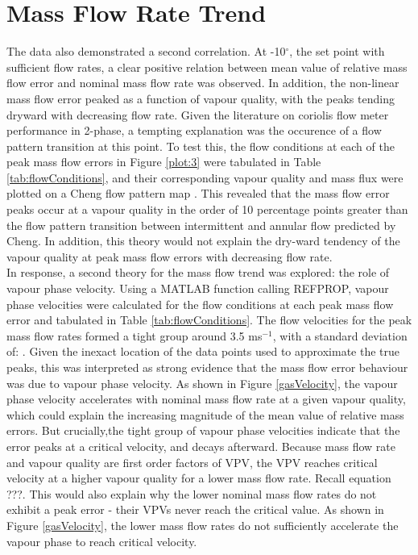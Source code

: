 \documentclass{report}
\begin{document}
\section{Mass Flow Rate Trend}
The data also demonstrated a second correlation. At -10$^\circ$, the set point with sufficient flow rates, a clear positive relation between mean value of relative mass flow error and nominal mass flow rate was observed. In addition, the non-linear mass flow error peaked as a function of vapour quality, with the peaks tending dryward with decreasing flow rate. Given the literature on coriolis flow meter performance in 2-phase, a tempting explanation was the occurence of a flow pattern transition at this point. To test this, the flow conditions at each of the peak mass flow errors in Figure \ref{plot:3} were tabulated in Table \ref{tab:flowConditions}, and their corresponding vapour quality and mass flux were plotted on a Cheng flow pattern map \cite{cheng 2008}. This revealed that the mass flow error peaks occur at a vapour quality in the order of 10 percentage points greater than the flow pattern transition between intermittent and annular flow predicted by Cheng. In addition, this theory would not explain the dry-ward tendency of the vapour quality at peak mass flow errors with decreasing flow rate.\\
In response, a second theory for the mass flow trend was explored: the role of vapour phase velocity. Using a MATLAB function calling REFPROP, vapour phase velocities were calculated for the flow conditions at each peak mass flow error and tabulated in Table \ref{tab:flowConditions}. The flow velocities for the peak mass flow rates formed a tight group around 3.5 ms$^{-1}$, with a standard deviation of: . Given the inexact location of the data points used to approximate the true peaks, this was interpreted as strong evidence that the mass flow error behaviour was due to vapour phase velocity. As shown in Figure \ref{gasVelocity}, the vapour phase velocity accelerates with nominal mass flow rate at a given vapour quality, which could explain the increasing magnitude of the mean value of relative mass errors. But crucially,the tight group of vapour phase velocities indicate that the error peaks at a critical velocity, and decays afterward. Because mass flow rate and vapour quality are first order factors of VPV, the VPV reaches critical velocity at a higher vapour quality for a lower mass flow rate. Recall equation ???. This would also explain why the lower nominal mass flow rates do not exhibit a peak error - their VPVs never reach the critical value. As shown in Figure \ref{gasVelocity}, the lower mass flow rates do not sufficiently accelerate the vapour phase to reach critical velocity.
\end{document}
